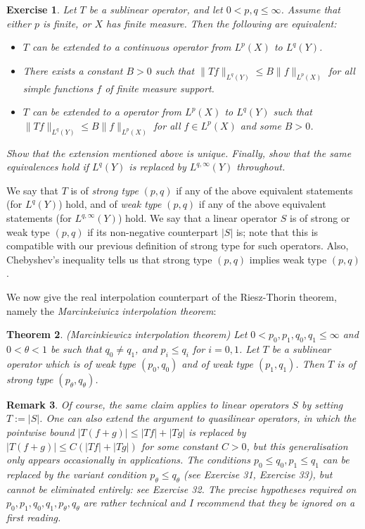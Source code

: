 \documentclass[10pt,reqno]{amsart}
\newtheorem{theorem}{Theorem}
\newtheorem{exercise}[theorem]{Exercise}
\newtheorem{remark}[theorem]{Remark}
\begin{document}
\begin{exercise}
    Let $T$ be a sublinear operator, and let $0 < p, q \leq \infty$. Assume that either $p$ is finite, or $X$ has finite measure. Then the following are equivalent:
    \begin{itemize}
        \item $T$ can be extended to a continuous operator from $L^p(X)$ to $L^q(Y)$.
        \item There exists a constant $B > 0$ such that $\|Tf\|_{L^q(Y)} \leq B \|f\|_{L^p(X)}$ for all simple functions $f$ of finite measure support.
        \item $T$ can be extended to a operator from $L^p(X)$ to $L^q(Y)$ such that $\|Tf\|_{L^q(Y)} \leq B \|f\|_{L^p(X)}$ for all $f \in L^p(X)$ and some $B > 0$.
    \end{itemize}
    Show that the extension mentioned above is unique. Finally, show that the same equivalences hold if $L^q(Y)$ is replaced by $L^{q,\infty}(Y)$ throughout. 
\end{exercise}

We say that $T$ is of \emph{strong type} $(p,q)$ if any of the above equivalent statements (for $L^q(Y)$) hold, and of \emph{weak type} $(p,q)$ if any of the above equivalent statements (for $L^{q,\infty}(Y)$) hold. We say that a linear operator $S$ is of strong or weak type $(p,q)$ if its non-negative counterpart $|S|$ is; note that this is compatible with our previous definition of strong type for such operators. Also, Chebyshev’s inequality tells us that strong type $(p,q)$ implies weak type $(p,q)$.

We now give the real interpolation counterpart of the Riesz-Thorin theorem, namely the \emph{Marcinkeiwicz interpolation theorem}:

\begin{theorem}
    (Marcinkiewicz interpolation theorem) Let $0 < p_0, p_1, q_0, q_1 \leq \infty$ and $0 < \theta < 1$ be such that $q_0 \neq q_1$, and $p_i \leq q_i$ for $i=0,1$. Let $T$ be a sublinear operator which is of weak type $(p_0,q_0)$ and of weak type $(p_1,q_1)$. Then $T$ is of strong type $(p_\theta,q_\theta)$. 
\end{theorem}

\begin{remark}
    Of course, the same claim applies to linear operators $S$ by setting $T := |S|$. One can also extend the argument to quasilinear operators, in which the pointwise bound $|T(f+g)| \leq |Tf| + |Tg|$ is replaced by $|T(f+g)| \leq C(|Tf|+|Tg|)$ for some constant $C > 0$, but this generalisation only appears occasionally in applications. The conditions $p_0 \leq q_0, p_1 \leq q_1$ can be replaced by the variant condition $p_\theta \leq q_\theta$ (see Exercise 31, Exercise 33), but cannot be eliminated entirely: see Exercise 32. The precise hypotheses required on $p_0,p_1,q_0,q_1,p_\theta,q_\theta$ are rather technical and I recommend that they be ignored on a first reading. 
\end{remark}
\end{document}
